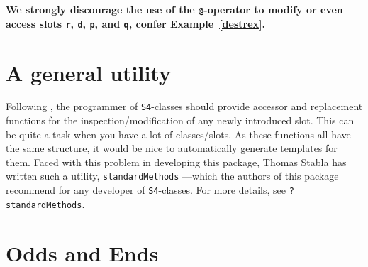 \documentclass[11pt]{article}
\newcommand{\code}[1]{{\tt #1}}
\begin{document}
\begin{itemize}
{\bf We strongly discourage the use of the \code{@}-operator to modify
or even access slots \code{r}, \code{d}, \code{p}, and \code{q}, confer
Example~{\ref{destrex}}.}
\end{itemize}
%
\section{A general utility}
%
Following \cite{OOPGent}, the programmer of {\tt S4}-classes should provide
accessor and replacement functions for the inspection/modification of
any newly introduced slot. This can be quite a task when you have a
lot of classes/slots.
As these functions all have the same structure, it would be nice
to automatically generate templates for them.
Faced with this problem in developing this package, Thomas Stabla
has written such a utility, \code{standardMethods} ---which the authors
of this package recommend for any developer of {\tt S4}-classes.
For more details, see \code{?standardMethods}.

\section{Odds and Ends}
\end{document}
